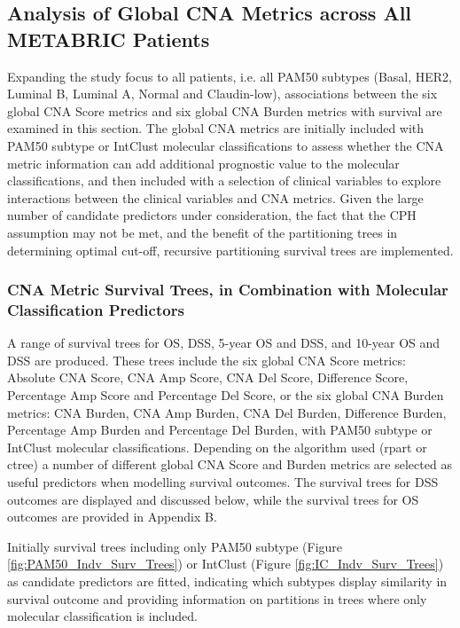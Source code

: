 \subsection{Analysis of Global CNA Metrics across All METABRIC Patients}
Expanding the study focus to all patients, i.e. all PAM50 subtypes (Basal, HER2, Luminal B, Luminal A, Normal and Claudin-low), associations between the six global CNA Score metrics and six global CNA Burden metrics with survival are examined in this section. The global CNA metrics are initially included with PAM50 subtype or IntClust molecular classifications to assess whether the CNA metric information can add additional prognostic value to the molecular classifications, and then included with a selection of clinical variables to explore interactions between the clinical variables and CNA metrics. Given the large number of candidate predictors under consideration, the fact that the CPH assumption may not be met, and the benefit of the partitioning trees in determining optimal cut-off, recursive partitioning survival trees are implemented. 

\subsubsection{CNA Metric Survival Trees, in Combination with Molecular Classification Predictors} 
A range of survival trees for OS, DSS, 5-year OS and DSS, and 10-year OS and DSS are produced. These trees include the six global CNA Score metrics: Absolute CNA Score, CNA Amp Score, CNA Del Score, Difference Score, Percentage Amp Score and Percentage Del Score, or the six global CNA Burden metrics: CNA Burden, CNA Amp Burden, CNA Del Burden, Difference Burden, Percentage Amp Burden and Percentage Del Burden, with PAM50 subtype or IntClust molecular classifications. Depending on the algorithm used (rpart or ctree) a number of different global CNA Score and Burden metrics are selected as useful predictors when modelling survival outcomes. The survival trees for DSS outcomes are displayed and discussed below, while the survival trees for OS outcomes are provided in Appendix B. 

Initially survival trees including only PAM50 subtype (Figure \ref{fig:PAM50_Indv_Surv_Trees}) or IntClust (Figure \ref{fig:IC_Indv_Surv_Trees}) as candidate predictors are fitted, indicating which subtypes display similarity in survival outcome and providing information on partitions in trees where only molecular classification is included.

